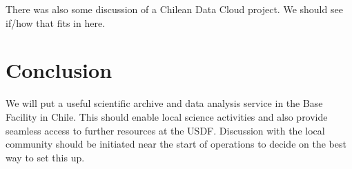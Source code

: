 

There was also some discussion of a Chilean Data Cloud project. We should see if/how that fits in here.


\section{Conclusion}

We will put a useful scientific archive and data analysis service in the Base Facility in Chile.
This should enable local science activities and also provide seamless access to further resources at the USDF.
Discussion with the local community should be initiated near the start of operations to decide on the best way to set this up.
